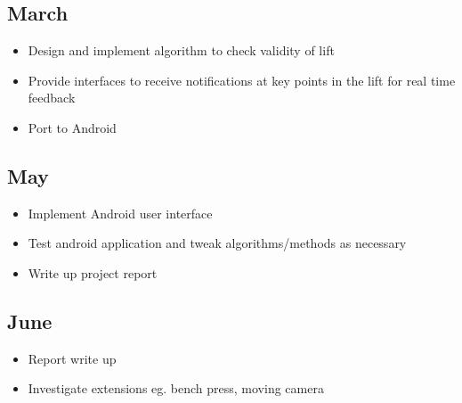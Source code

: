\subsection{March}

\begin{itemize}
	\item Design and implement algorithm to check validity of lift
	\item Provide interfaces to receive notifications at key points in the lift for real time feedback
	\item Port to Android
\end{itemize}

\subsection{May}

\begin{itemize}
	\item Implement Android user interface
	\item Test android application and tweak algorithms/methods as necessary
	\item Write up project report
\end{itemize}

\subsection{June}

\begin{itemize}
	\item Report write up
	\item Investigate extensions eg. bench press, moving camera
\end{itemize}